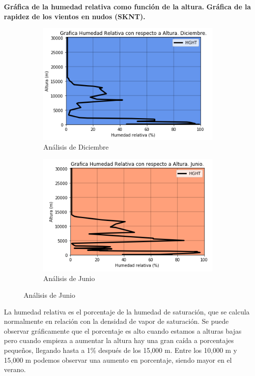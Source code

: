 \documentclass[12pt]{article}
\begin{document}
\noindent\textbf{Gráfica de la humedad relativa como función de la altura.}
\noindent\textbf{Gráfica de la rapidez de los vientos en nudos (SKNT).} 
\begin{figure}[h!]
\begin{subfigure}{.55\textwidth}
  \centering
  \includegraphics[width=.8\linewidth]{GrafAHDec.png}
  \caption{Análisis de Diciembre}
  \label{fig:sfig1}
\end{subfigure}
\begin{subfigure}{.55\textwidth}
  \centering
  \includegraphics[width=.8\linewidth]{GrafAHJun.png}
  \caption{Análisis de Junio}
  \label{fig:sfig2}
\end{subfigure}
\end{figure}

La humedad relativa es el porcentaje de la humedad de saturación, que se calcula normalmente en relación con la densidad de vapor de saturación. Se puede observar gráficamente que el porcentaje es alto cuando estamos a alturas bajas pero cuando empieza a aumentar la altura hay una gran caída a porcentajes pequeños, llegando hasta a 1\% después de los 15,000 m. Entre los 10,000 m y 15,000 m podemos observar una aumento en porcentaje, siendo mayor en el verano.
\end{document}
